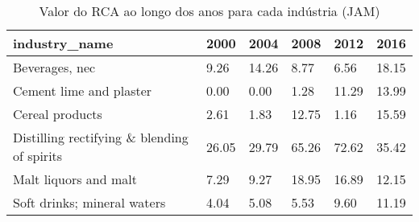 \begin{table}
\centering
\caption{Valor do RCA ao longo dos anos para cada indústria (JAM)}
\begin{tabular}{p{6cm}p{1.5cm}p{1.5cm}p{1.5cm}p{1.5cm}p{1.5cm}}
\toprule
                              industry\_name &  2000 &  2004 &  2008 &  2012 &  2016 \\
\midrule
                             Beverages, nec &  9.26 & 14.26 &  8.77 &  6.56 & 18.15 \\
                    Cement lime and plaster &  0.00 &  0.00 &  1.28 & 11.29 & 13.99 \\
                            Cereal products &  2.61 &  1.83 & 12.75 &  1.16 & 15.59 \\
Distilling rectifying \& blending of spirits & 26.05 & 29.79 & 65.26 & 72.62 & 35.42 \\
                      Malt liquors and malt &  7.29 &  9.27 & 18.95 & 16.89 & 12.15 \\
                Soft drinks; mineral waters &  4.04 &  5.08 &  5.53 &  9.60 & 11.19 \\
\bottomrule
\end{tabular}
\end{table}
